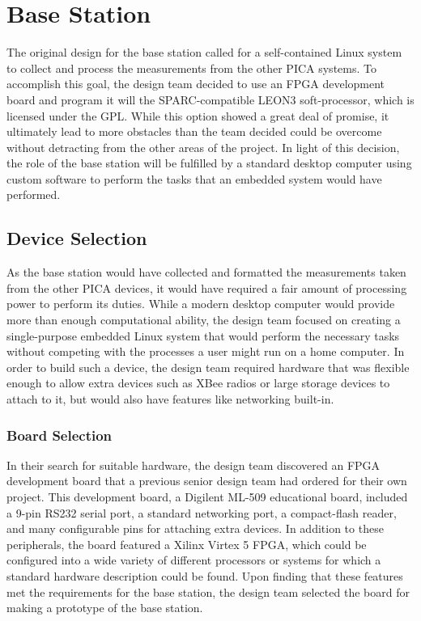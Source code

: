 \section{Base Station}
The original design for the base station called for a self-contained Linux
system to collect and process the measurements from the other PICA
systems. To accomplish this goal, the design team decided to use an
\ac{FPGA} development board and program it will the SPARC-compatible LEON3
soft-processor, which is licensed under the \ac{GPL}. While this option
showed a great deal of promise, it ultimately lead to more obstacles than
the team decided could be overcome without detracting from the other areas
of the project. In light of this decision, the role of the base station
will be fulfilled by a standard desktop computer using custom software to
perform the tasks that an embedded system would have performed.



\subsection{Device Selection}
As the base station would have collected and formatted the measurements
taken from the other PICA devices, it would have required a fair amount of
processing power to perform its duties. While a modern desktop computer
would provide more than enough computational ability, the design team
focused on creating a single-purpose embedded Linux system that would
perform the necessary tasks without competing with the processes a user
might run on a home computer. In order to build such a device, the design
team required hardware that was flexible enough to allow extra devices such
as XBee radios or large storage devices to attach to it, but would also
have features like networking built-in.

\subsubsection{Board Selection}
In their search for suitable hardware, the design team discovered an
\ac{FPGA} development board that a previous senior design team had ordered
for their own project. This development board, a Digilent ML-509
educational board,  included a 9-pin \ac{RS232} serial port, a standard
networking port, a compact-flash reader, and many configurable pins for
attaching extra devices. In addition to these peripherals, the board
featured a Xilinx Virtex 5 \ac{FPGA}, which could be configured into a wide
variety of different processors or systems for which a standard hardware
description could be found. Upon finding that these features met the
requirements for the base station, the design team selected the board for
making a prototype of the base station.

